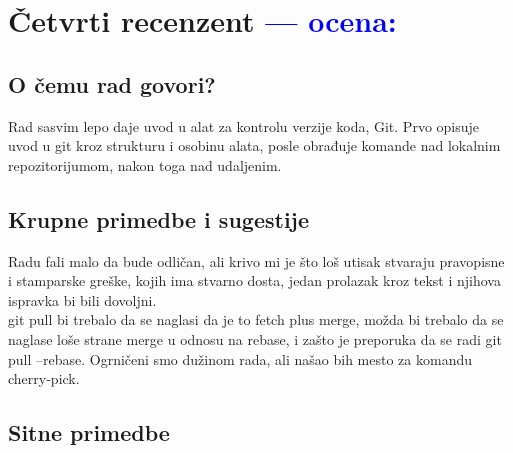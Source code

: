 \documentclass[a4paper]{report}
\newcommand{\odgovor}[1]{\textcolor{blue}{#1}}
\begin{document}
\chapter{Četvrti recenzent \odgovor{--- ocena:} }

\section{O čemu rad govori?}
Rad sasvim lepo daje uvod u alat za kontrolu verzije koda, Git. Prvo opisuje uvod u git kroz strukturu i osobinu alata, posle obrađuje komande nad lokalnim repozitorijumom, nakon toga nad udaljenim.
\section{Krupne primedbe i sugestije}
Radu fali malo da bude odličan, ali krivo mi je što loš utisak stvaraju pravopisne i stamparske greške, kojih ima stvarno dosta, jedan prolazak kroz tekst i njihova ispravka bi bili dovoljni.
\\
git pull bi trebalo da se naglasi da je to fetch plus merge, možda bi trebalo da se naglase loše strane merge u odnosu na rebase, i zašto je preporuka da se radi git pull --rebase. Ogrničeni smo dužinom rada, ali našao bih mesto za komandu cherry-pick.
\section{Sitne primedbe}
\end{document}
